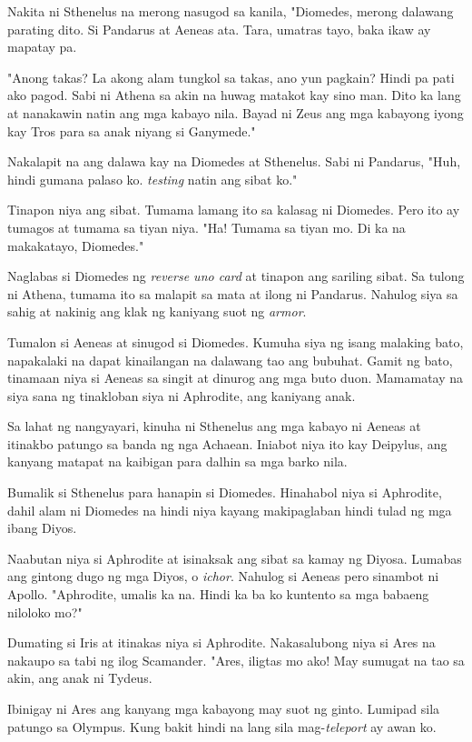 \documentclass[12pt,letterpaper]{report}
\begin{document}
Nakita ni Sthenelus na merong nasugod sa kanila, "Diomedes, merong dalawang parating dito. Si Pandarus at Aeneas ata. Tara, umatras tayo, baka ikaw ay mapatay pa.

"Anong takas? La akong alam tungkol sa takas, ano yun pagkain? Hindi pa pati ako pagod. Sabi ni Athena sa akin na huwag matakot kay sino man. Dito ka lang at nanakawin natin ang mga kabayo nila. Bayad ni Zeus ang mga kabayong iyong kay Tros para sa anak niyang si Ganymede."

Nakalapit na ang dalawa kay na Diomedes at Sthenelus. Sabi ni Pandarus, "Huh, hindi gumana palaso ko. \textit{testing} natin ang sibat ko."

Tinapon niya ang sibat. Tumama lamang ito sa kalasag ni Diomedes. Pero ito ay tumagos at tumama sa tiyan niya. "Ha! Tumama sa tiyan mo. Di ka na makakatayo, Diomedes."

Naglabas si Diomedes ng \textit{reverse uno card} at tinapon ang sariling sibat. Sa tulong ni Athena, tumama ito sa malapit sa mata at ilong ni Pandarus. Nahulog siya sa sahig at nakinig ang klak ng kaniyang suot ng \textit{armor}.

Tumalon si Aeneas at sinugod si Diomedes. Kumuha siya ng isang malaking bato, napakalaki na dapat kinailangan na dalawang tao ang bubuhat. Gamit ng bato, tinamaan niya si Aeneas sa singit at dinurog ang mga buto duon.
Mamamatay na siya sana ng tinakloban siya ni Aphrodite, ang kaniyang anak.

Sa lahat ng nangyayari, kinuha ni Sthenelus ang mga kabayo ni Aeneas at itinakbo patungo sa banda ng nga Achaean. Iniabot niya ito kay Deipylus, ang kanyang matapat na kaibigan para dalhin sa mga barko nila.

Bumalik si Sthenelus para hanapin si Diomedes. Hinahabol niya si Aphrodite, dahil alam ni Diomedes na hindi niya kayang makipaglaban hindi tulad ng mga ibang Diyos.

Naabutan niya si Aphrodite at isinaksak ang sibat sa kamay ng Diyosa. Lumabas ang gintong dugo ng mga Diyos, o \textit{ichor}. Nahulog si Aeneas pero sinambot ni Apollo. "Aphrodite, umalis ka na. Hindi ka ba ko kuntento sa mga babaeng niloloko mo?"

Dumating si Iris at itinakas niya si Aphrodite. Nakasalubong niya si Ares na nakaupo sa tabi ng ilog Scamander. "Ares, iligtas mo ako! May sumugat na tao sa akin, ang anak ni Tydeus.

Ibinigay ni Ares ang kanyang mga kabayong may suot ng ginto. Lumipad sila patungo sa Olympus. Kung bakit hindi na lang sila mag-\textit{teleport} ay awan ko.
\end{document}
